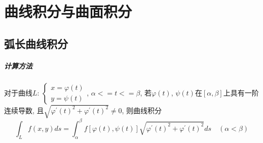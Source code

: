 \documentclass[main.tex]{subfiles}
\begin{document}
\chapter{曲线积分与曲面积分}
\section{弧长曲线积分}
\paragraph{计算方法}
对于曲线$L$: $\begin{cases}x = \varphi (t) \\ y = \psi (t)\end{cases}$, $\alpha <= t <= \beta$, 若$\varphi (t)$, $\psi (t)$在$[\alpha, \beta]$上具有一阶连续导数, 且$\sqrt{{\varphi ^ {'} (t)} ^ 2 + {\varphi ^ {'} (t)} ^ 2} \not= 0$, 则曲线积分
\[
    \int _ L f(x, y) ds = \int _\alpha ^\beta f[\varphi (t), \psi (t)] \sqrt{{\varphi ^ {'} (t)} ^ 2 + {\varphi ^ {'} (t)} ^ 2} ds \quad (\alpha < \beta)
\]
\end{document}
